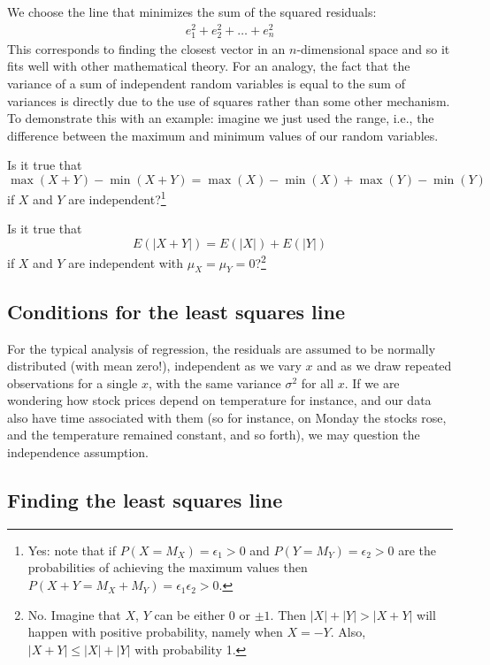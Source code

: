 	We choose the line that minimizes the sum of the squared residuals:
	\begin{eqnarray}
	e_{1}^2 + e_{2}^2 + \dots + e_{n}^2
	\label{sumOfSquaresForResiduals}
	\end{eqnarray}
	This corresponds to finding the closest vector in an $n$-dimensional space and so it fits well with other mathematical theory.
	For an analogy, the fact that the variance of a sum of independent random variables is equal to the sum of variances is directly due to
	the use of squares rather than some other mechanism.
	To demonstrate this with an example: imagine we just used the range, i.e., the difference between the maximum and minimum values of our random variables.
	\begin{exercise}
		Is it true that
		\[
			\max(X+Y)-\min(X+Y)=\max(X)-\min(X)+\max(Y)-\min(Y)
		\]
		if $X$ and $Y$ are independent?\footnote{
			Yes: note that if $P(X=M_X)=\epsilon_1>0$ and $P(Y=M_Y)=\epsilon_2>0$ are the probabilities of achieving the maximum values
			then $P(X+Y=M_X+M_Y)=\epsilon_1\epsilon_2>0$.
		}
	\end{exercise}
	\begin{exercise}
		Is it true that
		\[
			E(|X+Y|)=E(|X|) + E(|Y|)
		\]
		if $X$ and $Y$ are independent with $\mu_X=\mu_Y=0$?\footnote{No. Imagine that $X$, $Y$ can be either 0 or $\pm 1$. Then $|X|+|Y|>|X+Y|$ will happen with positive probability, namely when $X=-Y$. Also, $|X+Y|\le |X|+|Y|$ with probability 1.}
	\end{exercise}

\subsection{Conditions for the least squares line}

	For the typical analysis of regression, the residuals are assumed to be normally distributed (with mean zero!),
	independent as we vary $x$ and as we draw repeated observations for a single $x$, with the same variance $\sigma^2$ for all $x$.
	If we are wondering how stock prices depend on temperature for instance, and our data also have time associated with them
	(so for instance, on Monday the stocks rose, and the temperature remained constant, and so forth),
	we may question the independence assumption.

\subsection{Finding the least squares line}
\label{findingTheLeastSquaresLineSection}

